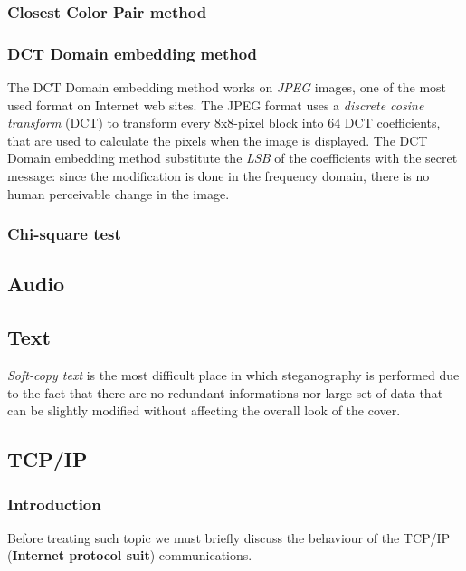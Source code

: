 \documentclass[../../main.tex]{subfiles}
\begin{document}
    \subsubsection{Closest Color Pair method}


    \subsubsection{DCT Domain embedding method}
    The DCT Domain embedding method works on \emph{JPEG} images, one of the most
    used format on Internet web sites.
    The JPEG format uses a \emph{discrete cosine transform} (DCT) to transform
    every 8x8-pixel block into 64 DCT coefficients, that are used to calculate
    the pixels when the image is displayed.
    The DCT Domain embedding method substitute the \emph{LSB} of the
    coefficients with the secret message: since the modification is done in the
    frequency domain, there is no human perceivable change in the image.

    \subsubsection{Chi-square test}

    \subsection{Audio}
    
    \subsection{Text}
    \emph{Soft-copy text} is the most difficult place in which steganography is
    performed due to the fact that there are no redundant informations nor large
    set of data that can be slightly modified without affecting the overall look
    of the cover.

    \subsection{TCP/IP}
    \subsubsection{Introduction}
    Before treating such topic we must briefly discuss the behaviour of the
    TCP/IP (\textbf{Internet protocol suit}) communications.
    
\end{document}
